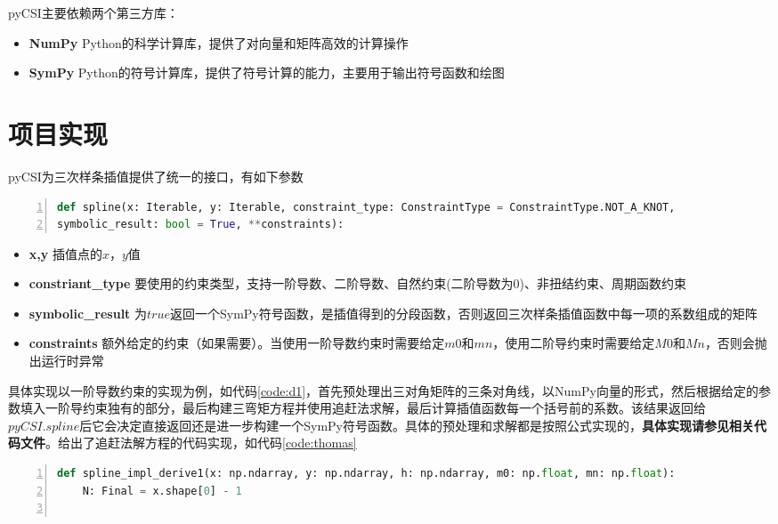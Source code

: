 \documentclass[a4paper,twoside]{article}
\begin{document}
\begin{spacing}{1.2}
pyCSI主要依赖两个第三方库：

\begin{itemize}
	\item \textbf{NumPy} Python的科学计算库，提供了对向量和矩阵高效的计算操作
	\item \textbf{SymPy} Python的符号计算库，提供了符号计算的能力，主要用于输出符号函数和绘图
\end{itemize}

\section{项目实现}

pyCSI为三次样条插值提供了统一的接口，有如下参数
\begin{lstlisting}[language=Python,numbers=left,style=PythonStyle,label={code:interface}]
def spline(x: Iterable, y: Iterable, constraint_type: ConstraintType = ConstraintType.NOT_A_KNOT,
symbolic_result: bool = True, **constraints):
\end{lstlisting}

\begin{itemize}
	\item \textbf{x,y} 插值点的$x$，$y$值
	\item \textbf{constriant\_type} 要使用的约束类型，支持一阶导数、二阶导数、自然约束(二阶导数为0)、非扭结约束、周期函数约束
	\item \textbf{symbolic\_result} 为$true$返回一个SymPy符号函数，是插值得到的分段函数，否则返回三次样条插值函数中每一项的系数组成的矩阵
	\item \textbf{constraints} 额外给定的约束（如果需要）。当使用一阶导数约束时需要给定$m0$和$mn$，使用二阶导约束时需要给定$M0$和$Mn$，否则会抛出运行时异常
\end{itemize}

具体实现以一阶导数约束的实现为例，如代码\ref{code:d1}，首先预处理出三对角矩阵的三条对角线，以NumPy向量的形式，然后根据给定的参数填入一阶导约束独有的部分，最后构建三弯矩方程并使用追赶法求解，最后计算插值函数每一个括号前的系数。该结果返回给$pyCSI.spline$后它会决定直接返回还是进一步构建一个SymPy符号函数。具体的预处理和求解都是按照公式实现的，\textbf{具体实现请参见相关代码文件}。给出了追赶法解方程的代码实现，如代码\ref{code:thomas}

\begin{lstlisting}[language=Python,numbers=left,style=PythonStyle,caption=一阶导数约束的实现,label={code:d1}]
def spline_impl_derive1(x: np.ndarray, y: np.ndarray, h: np.ndarray, m0: np.float, mn: np.float):
	N: Final = x.shape[0] - 1
	

\end{lstlisting}
\end{spacing}
\end{document}
